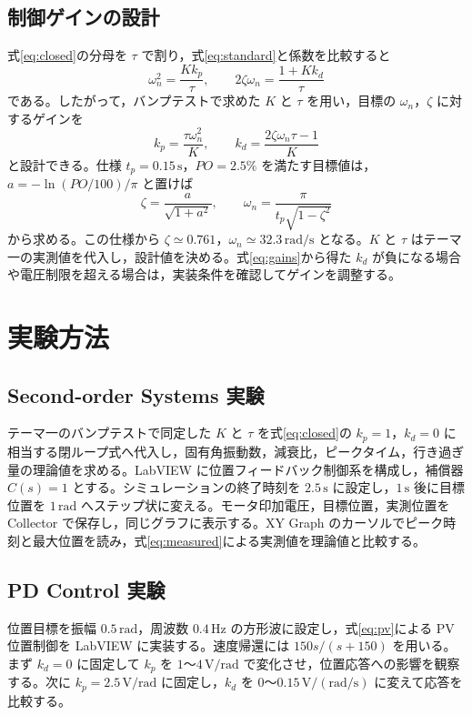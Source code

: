 \documentclass[dvipdfmx,a4paper,11pt]{jsarticle}
\begin{document}
\subsection{制御ゲインの設計}
式\eqref{eq:closed}の分母を $\tau$ で割り，式\eqref{eq:standard}と係数を比較すると
\begin{equation}
 \omega_n^2=\frac{Kk_p}{\tau},\qquad
 2\zeta\omega_n=\frac{1+Kk_d}{\tau}
 \label{eq:match}
\end{equation}
である。したがって，バンプテストで求めた $K$ と $\tau$ を用い，目標の $\omega_n$，$\zeta$ に対するゲインを
\begin{equation}
 k_p=\frac{\tau\omega_n^2}{K},\qquad
 k_d=\frac{2\zeta\omega_n\tau-1}{K}
 \label{eq:gains}
\end{equation}
と設計できる。仕様 $t_p=0.15\,\mathrm{s}$，$PO=2.5\%$ を満たす目標値は，$a=-\ln(PO/100)/\pi$ と置けば
\begin{equation}
 \zeta=\frac{a}{\sqrt{1+a^2}},\qquad
 \omega_n=\frac{\pi}{t_p\sqrt{1-\zeta^2}}
 \label{eq:targets}
\end{equation}
から求める。この仕様から $\zeta\simeq0.761$，$\omega_n\simeq32.3\,\mathrm{rad/s}$ となる。$K$ と $\tau$ はテーマ一の実測値を代入し，設計値を決める。式\eqref{eq:gains}から得た $k_d$ が負になる場合や電圧制限を超える場合は，実装条件を確認してゲインを調整する。

\section{実験方法}
\subsection{Second-order Systems 実験}
テーマ一のバンプテストで同定した $K$ と $\tau$ を式\eqref{eq:closed}の $k_p=1$，$k_d=0$ に相当する閉ループ式へ代入し，固有角振動数，減衰比，ピークタイム，行き過ぎ量の理論値を求める。LabVIEW に位置フィードバック制御系を構成し，補償器 $C(s)=1$ とする。シミュレーションの終了時刻を $2.5\,\mathrm{s}$ に設定し，$1\,\mathrm{s}$ 後に目標位置を $1\,\mathrm{rad}$ へステップ状に変える。モータ印加電圧，目標位置，実測位置を Collector で保存し，同じグラフに表示する。XY Graph のカーソルでピーク時刻と最大位置を読み，式\eqref{eq:measured}による実測値を理論値と比較する。

\clearpage
\subsection{PD Control 実験}
位置目標を振幅 $0.5\,\mathrm{rad}$，周波数 $0.4\,\mathrm{Hz}$ の方形波に設定し，式\eqref{eq:pv}による PV 位置制御を LabVIEW に実装する。速度帰還には $150s/(s+150)$ を用いる。まず $k_d=0$ に固定して $k_p$ を $1$～$4\,\mathrm{V/rad}$ で変化させ，位置応答への影響を観察する。次に $k_p=2.5\,\mathrm{V/rad}$ に固定し，$k_d$ を $0$～$0.15\,\mathrm{V/(rad/s)}$ に変えて応答を比較する。
\end{document}
